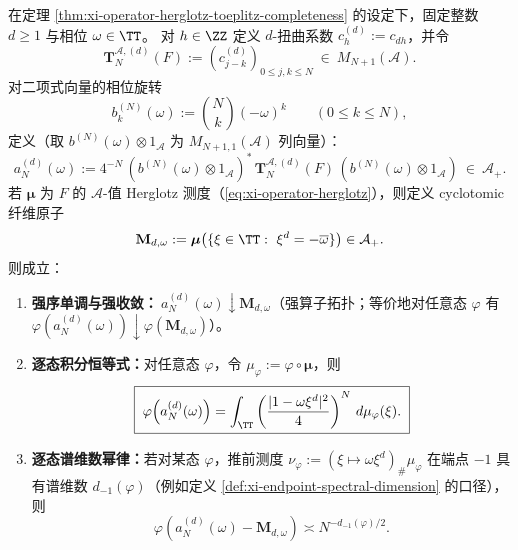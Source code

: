 \begin{theorem}\label{thm:xi-operator-adams-rotated-endpoint-probe-cyclotomic}
在定理 \ref{thm:xi-operator-herglotz-toeplitz-completeness} 的设定下，固定整数 \(d\ge 1\) 与相位 \(\omega\in\TT\)。
对 \(h\in\ZZ\) 定义 \(d\)-扭曲系数 \(c^{(d)}_h:=c_{dh}\)，并令
\[
\mathbf{T}^{\mathcal{A},(d)}_N(F):=(c^{(d)}_{j-k})_{0\le j,k\le N}\ \in\ M_{N+1}(\mathcal{A}).
\]
对二项式向量的相位旋转
\[
b^{(N)}_k(\omega):=\binom{N}{k}(-\omega)^k\qquad(0\le k\le N),
\]
定义（取 \(b^{(N)}(\omega)\otimes 1_{\mathcal A}\) 为 \(M_{N+1,1}(\mathcal A)\) 列向量）：
\begin{equation}\label{eq:xi-operator-adams-rotated-endpoint-probe}
\boxed{\;
a^{(d)}_N(\omega)
:=4^{-N}\,(b^{(N)}(\omega)\otimes 1_{\mathcal A})^\ast\,
\mathbf{T}^{\mathcal{A},(d)}_N(F)\,
(b^{(N)}(\omega)\otimes 1_{\mathcal A})\ \in\ \mathcal A_+.\;}
\end{equation}
若 \(\boldsymbol\mu\) 为 \(F\) 的 \(\mathcal A\)-值 Herglotz 测度（\eqref{eq:xi-operator-herglotz}），则定义 cyclotomic 纤维原子
\[
\mathbf{M}_{d,\omega}:=\boldsymbol\mu\bigl(\{\xi\in\TT:\ \xi^d=-\overline\omega\}\bigr)\in\mathcal A_+.
\]
则成立：
\begin{enumerate}
  \item \textbf{强序单调与强收敛：}\(\ a^{(d)}_N(\omega)\downarrow \mathbf{M}_{d,\omega}\)（强算子拓扑；等价地对任意态 \(\varphi\) 有 \(\varphi(a^{(d)}_N(\omega))\downarrow \varphi(\mathbf{M}_{d,\omega})\)）。
  \item \textbf{逐态积分恒等式：}对任意态 \(\varphi\)，令 \(\mu_\varphi:=\varphi\circ\boldsymbol\mu\)，则
  \begin{equation}\label{eq:xi-operator-adams-rotated-endpoint-probe-statewise-identity}
  \boxed{\;
  \varphi\!\left(a^{(d)}_N(\omega)\right)
  =\int_{\TT}\left(\frac{|1-\omega\xi^{d}|^{2}}{4}\right)^{N}\,d\mu_\varphi(\xi).\;}
  \end{equation}
  \item \textbf{逐态谱维数幂律：}若对某态 \(\varphi\)，推前测度
  \(
  \nu_\varphi:=(\xi\mapsto \omega\xi^{d})_\#\mu_\varphi
  \)
  在端点 \(-1\) 具有谱维数 \(d_{-1}(\varphi)\)（例如定义 \ref{def:xi-endpoint-spectral-dimension} 的口径），则
  \[
  \varphi\!\left(a^{(d)}_N(\omega)-\mathbf{M}_{d,\omega}\right)\asymp N^{-d_{-1}(\varphi)/2}.
  \]
\end{enumerate}
\end{theorem}

